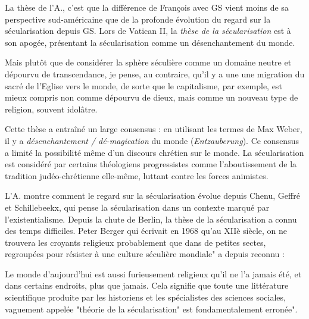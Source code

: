 La thèse de l'A., c'est que la différence de François avec GS vient moins de sa perspective sud-américaine que de la profonde évolution du regard sur la sécularisation depuis GS. Lors de Vatican II, la \textit{thèse de la sécularisation} est à son apogée, présentant la sécularisation comme un désenchantement du monde. 
\begin{singlequote}
    Mais plutôt que de considérer la sphère séculière comme un domaine neutre et dépourvu de transcendance, je pense, au contraire, qu'il y a une une migration du sacré de l'Eglise vers le monde, de sorte que le capitalisme, par exemple, est mieux compris non comme dépourvu de dieux, mais comme un nouveau type de religion, souvent idolâtre. \cite[p.143]{cavanaugh_idolatrie_2022}
\end{singlequote}
Cette thèse a entraîné un large consensus : en utilisant les termes de Max Weber, il y a \textit{désenchantement / dé-magication} du monde (\textit{Entzauberung}). Ce consensus a limité la possibilité même d'un discours chrétien sur le monde.
La sécularisation est considéré par certains théologiens progressistes comme l'aboutissement de la tradition judéo-chrétienne elle-même, luttant contre les forces animistes. 

L'A. montre comment le regard sur la sécularisation évolue depuis Chenu, Geffré et Schillebeekx, qui pense la sécularisation dans un contexte marqué par l'existentialisme. Depuis la chute de Berlin, la thèse de la sécularisation a connu des temps difficiles.
Peter Berger qui écrivait en 1968 qu'au XIIè siècle, on ne trouvera les croyants religieux probablement que dans de petites sectes, regroupées pour résister à une culture séculière mondiale" a depuis reconnu :
\begin{singlequote}
    Le monde d'aujourd'hui est aussi furieusement religieux qu'il ne l'a jamais été, et dans certains endroits, plus que jamais. Cela signifie que toute une littérature scientifique produite par les historiens et les spécialistes des sciences sociales, vaguement appelée "théorie de la sécularisation" est fondamentalement erronée". \cite{berger_desecularization_1999}
\end{singlequote}

